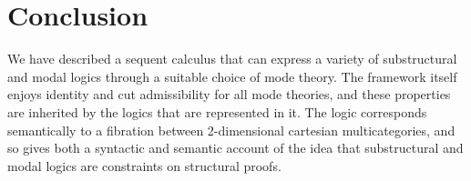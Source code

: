 
\section{Conclusion}

We have described a sequent calculus that can express a variety of
substructural and modal logics through a suitable choice of mode theory.
The framework itself enjoys identity and cut admissibility for all mode
theories, and these properties are inherited by the logics that are
represented in it.  The logic corresponds semantically to a fibration
between 2-dimensional cartesian multicategories, and so gives both a
syntactic and semantic account of the idea that substructural and modal
logics are constraints on structural proofs.  




